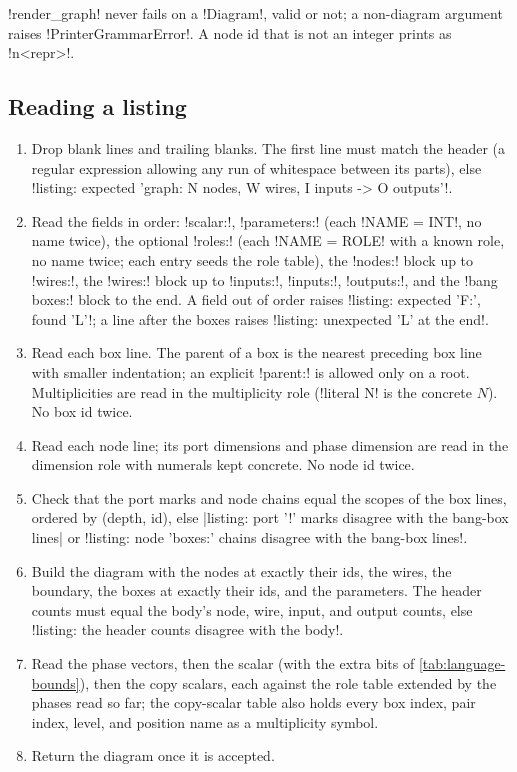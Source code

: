 \py!render_graph! never fails on a \py!Diagram!, valid or not; a non-diagram argument raises \py!PrinterGrammarError!. A node id that is not an integer prints as \code!n<repr>!.

\subsection{Reading a listing}

\begin{algorithm}\label{alg:language-listing}
\leavevmode
\begin{enumerate}
\item Drop blank lines and trailing blanks. The first line must match the header (a regular expression allowing any run of whitespace between its parts), else \code!listing: expected 'graph: N nodes, W wires, I inputs -> O outputs'!.
\item Read the fields in order: \code!scalar:!, \code!parameters:! (each \code!NAME = INT!, no name twice), the optional \code!roles:! (each \code!NAME = ROLE! with a known role, no name twice; each entry seeds the role table), the \code!nodes:! block up to \code!wires:!, the \code!wires:! block up to \code!inputs:!, \code!inputs:!, \code!outputs:!, and the \code!bang boxes:! block to the end. A field out of order raises \code!listing: expected 'F:', found 'L'!; a line after the boxes raises \code!listing: unexpected 'L' at the end!.
\item Read each box line. The parent of a box is the nearest preceding box line with smaller indentation; an explicit \code!parent:! is allowed only on a root. Multiplicities are read in the multiplicity role (\code!literal N! is the concrete $N$). No box id twice.
\item Read each node line; its port dimensions and phase dimension are read in the dimension role with numerals kept concrete. No node id twice.
\item Check that the port marks and node chains equal the scopes of the box lines, ordered by (depth, id), else \code|listing: port '!' marks disagree with the bang-box lines| or \code!listing: node 'boxes:' chains disagree with the bang-box lines!.
\item Build the diagram with the nodes at exactly their ids, the wires, the boundary, the boxes at exactly their ids, and the parameters. The header counts must equal the body's node, wire, input, and output counts, else \code!listing: the header counts disagree with the body!.
\item Read the phase vectors, then the scalar (with the extra bits of \cref{tab:language-bounds}), then the copy scalars, each against the role table extended by the phases read so far; the copy-scalar table also holds every box index, pair index, level, and position name as a multiplicity symbol.
\item Return the diagram once it is accepted.
\end{enumerate}
\end{algorithm}

